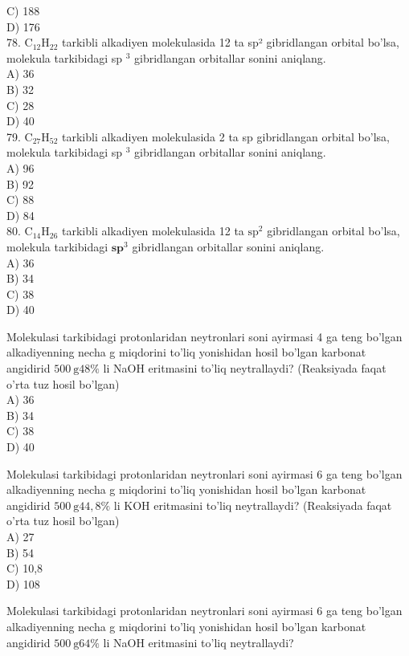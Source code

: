 C) 188\\
D) 176\\
78. $\mathrm{C}_{12} \mathrm{H}_{22}$ tarkibli alkadiyen molekulasida 12 ta sp² gibridlangan orbital bo'lsa, molekula tarkibidagi sp ${ }^{3}$ gibridlangan orbitallar sonini aniqlang.\\
A) 36\\
B) 32\\
C) 28\\
D) 40\\
79. $\mathrm{C}_{27} \mathrm{H}_{52}$ tarkibli alkadiyen molekulasida 2 ta sp gibridlangan orbital bo'lsa, molekula tarkibidagi sp ${ }^{3}$ gibridlangan orbitallar sonini aniqlang.\\
A) 96\\
B) 92\\
C) 88\\
D) 84\\
80. $\mathrm{C}_{14} \mathrm{H}_{26}$ tarkibli alkadiyen molekulasida 12 ta $\mathrm{sp}^{2}$ gibridlangan orbital bo'lsa, molekula tarkibidagi $\mathbf{s p}^{3}$ gibridlangan orbitallar sonini aniqlang.\\
A) 36\\
B) 34\\
C) 38\\
D) 40
  \item Molekulasi tarkibidagi protonlaridan neytronlari soni ayirmasi 4 ga teng bo'lgan alkadiyenning necha g miqdorini to'liq yonishidan hosil bo'lgan karbonat angidirid $500 \mathrm{~g} 48 \%$ li NaOH eritmasini to'liq neytrallaydi? (Reaksiyada faqat o'rta tuz hosil bo'lgan)\\
A) 36\\
B) 34\\
C) 38\\
D) 40
  \item Molekulasi tarkibidagi protonlaridan neytronlari soni ayirmasi 6 ga teng bo'lgan alkadiyenning necha g miqdorini to'liq yonishidan hosil bo'lgan karbonat angidirid $500 \mathrm{~g} 44,8 \%$ li KOH eritmasini to'liq neytrallaydi? (Reaksiyada faqat o'rta tuz hosil bo'lgan)\\
A) 27\\
B) 54\\
C) 10,8\\
D) 108
  \item Molekulasi tarkibidagi protonlaridan neytronlari soni ayirmasi 6 ga teng bo'lgan alkadiyenning necha g miqdorini to'liq yonishidan hosil bo'lgan karbonat angidirid $500 \mathrm{~g} 64 \%$ li NaOH eritmasini to'liq neytrallaydi?\\
